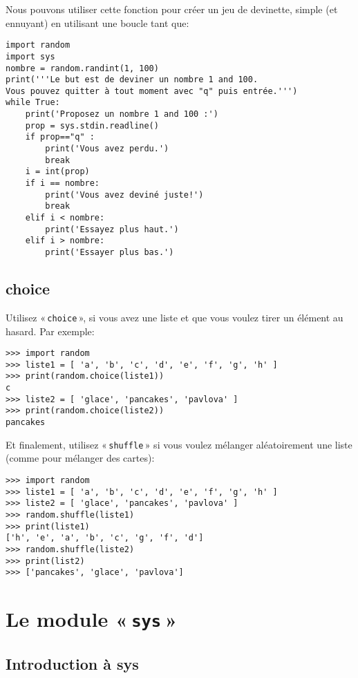 Nous pouvons utiliser cette fonction pour créer un jeu de devinette, simple (et ennuyant) en utilisant une boucle tant que:

\begin{Verbatim}[frame=single,rulecolor=\color{gray}]
import random
import sys
nombre = random.randint(1, 100)
print('''Le but est de deviner un nombre 1 and 100.
Vous pouvez quitter à tout moment avec "q" puis entrée.''')
while True:
    print('Proposez un nombre 1 and 100 :')
    prop = sys.stdin.readline()
    if prop=="q" :
        print('Vous avez perdu.')
        break
    i = int(prop)
    if i == nombre:
        print('Vous avez deviné juste!')
        break
    elif i < nombre:
        print('Essayez plus haut.')
    elif i > nombre:
        print('Essayer plus bas.')
\end{Verbatim}

\subsection{choice}

Utilisez « \verb+choice+ »,  si vous avez une liste et que vous voulez tirer un élément au hasard. Par exemple:

\begin{Verbatim}[frame=single,rulecolor=\color{gray}]
>>> import random
>>> liste1 = [ 'a', 'b', 'c', 'd', 'e', 'f', 'g', 'h' ]
>>> print(random.choice(liste1))
c
>>> liste2 = [ 'glace', 'pancakes', 'pavlova' ]
>>> print(random.choice(liste2))
pancakes
\end{Verbatim}

Et finalement, utilisez « \verb+shuffle+ » si vous voulez mélanger aléatoirement une liste (comme pour mélanger des cartes):

\begin{Verbatim}[frame=single,rulecolor=\color{gray}]
>>> import random
>>> liste1 = [ 'a', 'b', 'c', 'd', 'e', 'f', 'g', 'h' ]
>>> liste2 = [ 'glace', 'pancakes', 'pavlova' ]
>>> random.shuffle(liste1)
>>> print(liste1)
['h', 'e', 'a', 'b', 'c', 'g', 'f', 'd']
>>> random.shuffle(liste2)
>>> print(list2)
>>> ['pancakes', 'glace', 'pavlova']
\end{Verbatim}

\section{Le module « \texttt{sys} »}
\subsection{Introduction à sys}

